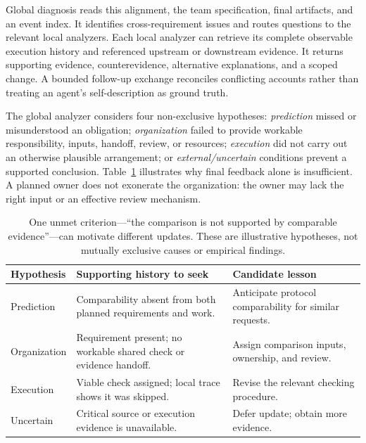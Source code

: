 \documentclass[11pt]{article}
\begin{document}
Global diagnosis reads this alignment, the team specification, final artifacts, and an event index. It identifies cross-requirement issues and routes questions to the relevant local analyzers. Each local analyzer can retrieve its complete observable execution history and referenced upstream or downstream evidence. It returns supporting evidence, counterevidence, alternative explanations, and a scoped change. A bounded follow-up exchange reconciles conflicting accounts rather than treating an agent's self-description as ground truth.

The global analyzer considers four non-exclusive hypotheses: \emph{prediction} missed or misunderstood an obligation; \emph{organization} failed to provide workable responsibility, inputs, handoff, review, or resources; \emph{execution} did not carry out an otherwise plausible arrangement; or \emph{external/uncertain} conditions prevent a supported conclusion. Table~\ref{tab:example} illustrates why final feedback alone is insufficient. A planned owner does not exonerate the organization: the owner may lack the right input or an effective review mechanism.

\begin{table}[t]
\small\centering
\begin{tabularx}{\columnwidth}{@{}>{\raggedright\arraybackslash}p{1.65cm}>{\raggedright\arraybackslash}X>{\raggedright\arraybackslash}X@{}}
\toprule
Hypothesis & Supporting history to seek & Candidate lesson \\
\midrule
Prediction & Comparability absent from both planned requirements and work. & Anticipate protocol comparability for similar requests. \\
Organization & Requirement present; no workable shared check or evidence handoff. & Assign comparison inputs, ownership, and review. \\
Execution & Viable check assigned; local trace shows it was skipped. & Revise the relevant checking procedure. \\
Uncertain & Critical source or execution evidence is unavailable. & Defer update; obtain more evidence. \\
\bottomrule
\end{tabularx}
\caption{One unmet criterion---``the comparison is not supported by comparable evidence''---can motivate different updates. These are illustrative hypotheses, not mutually exclusive causes or empirical findings.}
\label{tab:example}
\end{table}
\end{document}

